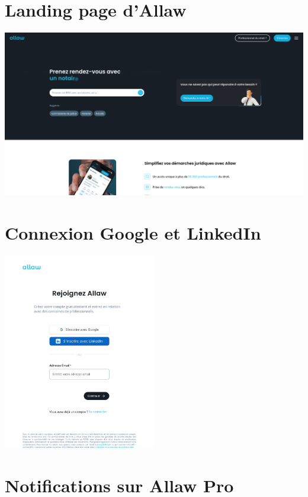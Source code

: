
\section{Landing page d'Allaw}\label{appendix:landing_page}

\includegraphics[width=1.0\textwidth]{media/screenshot_allaw_landing_page.png}

\section{Connexion Google et LinkedIn}\label{appendix:signup}

\includegraphics[width=0.5\textwidth]{media/screenshot_allaw_signup.png}

\section{Notifications sur Allaw Pro}\label{appendix:notifications}

